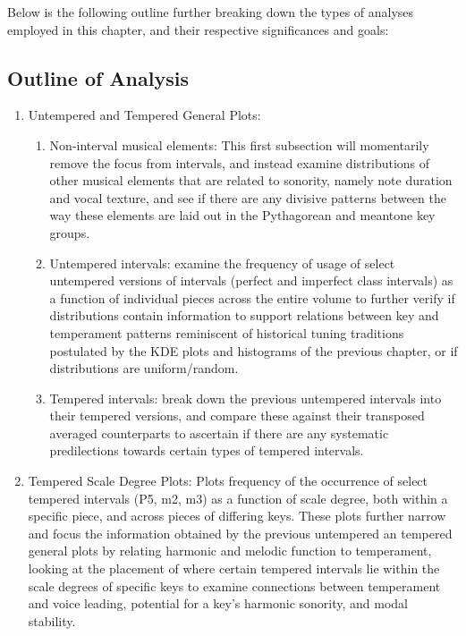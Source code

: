 Below is the following outline further breaking down the types of
analyses employed in this chapter, and their respective significances
and goals:

\subsection{Outline of Analysis}\label{outline-of-analysis}

\begin{enumerate}
\def\labelenumi{\arabic{enumi}.}
\tightlist
\item
  Untempered and Tempered General Plots:

  \begin{enumerate}
  \def\labelenumii{\arabic{enumii}.}
  \tightlist
  \item
    Non-interval musical elements: This first subsection will
    momentarily remove the focus from intervals, and instead examine
    distributions of other musical elements that are related to
    sonority, namely note duration and vocal texture, and see if there
    are any divisive patterns between the way these elements are laid
    out in the Pythagorean and meantone key groups.
  \item
    Untempered intervals: examine the frequency of usage of select
    untempered versions of intervals (perfect and imperfect class
    intervals) as a function of individual pieces across the entire
    volume to further verify if distributions contain information to
    support relations between key and temperament patterns reminiscent
    of historical tuning traditions postulated by the KDE plots and
    histograms of the previous chapter, or if distributions are
    uniform/random.
  \item
    Tempered intervals: break down the previous untempered intervals
    into their tempered versions, and compare these against their
    transposed averaged counterparts to ascertain if there are any
    systematic predilections towards certain types of tempered
    intervals.
  \end{enumerate}
\item
  Tempered Scale Degree Plots: Plots frequency of the occurrence of
  select tempered intervals (P5, m2, m3) as a function of scale degree,
  both within a specific piece, and across pieces of differing keys.
  These plots further narrow and focus the information obtained by the
  previous untempered an tempered general plots by relating harmonic and
  melodic function to temperament, looking at the placement of where
  certain tempered intervals lie within the scale degrees of specific
  keys to examine connections between temperament and voice leading,
  potential for a key's harmonic sonority, and modal stability.
\end{enumerate}

